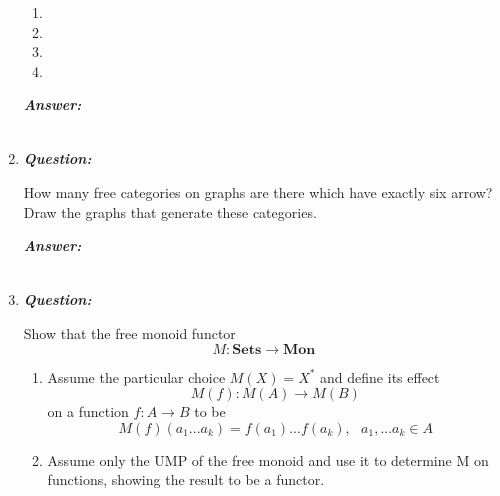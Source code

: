 \documentclass{article}
\begin{document}
\begin{enumerate}
\begin{enumerate}
		      \item {}

		      \item {}

		      \item {}

		      \item {}
	      \end{enumerate}

	      \textbf{\textit{Answer:}}

	      \begin{align*}
	      \end{align*}

	\item
	      \textbf{\textit{Question:}}

	      How many free categories on graphs are there which have exactly six arrow? Draw the graphs that generate these categories.

	      \textbf{\textit{Answer:}}

	      \begin{align*}
	      \end{align*}



	\item
	      \textbf{\textit{Question:}}

	      Show that the free monoid functor
	      \[
		      M : \textbf{Sets} \rightarrow \textbf{Mon}
	      \]
	      \begin{enumerate}
		      \item Assume the particular choice $ M(X) = X^*   $ and define its effect
		            \[
			            M(f) : M(A) \rightarrow M(B)
		            \]
		            on a function $ f : A \rightarrow B$ to be
		            \[
			            M(f)(a_1...a_k) = f(a_1) ... f(a_k), \ \ \ a_1,...a_k \in A
		            \]
		      \item Assume only the UMP of the free monoid and use it to determine M on functions, showing the result to be a functor.


\end{enumerate}
\end{enumerate}
\end{document}
